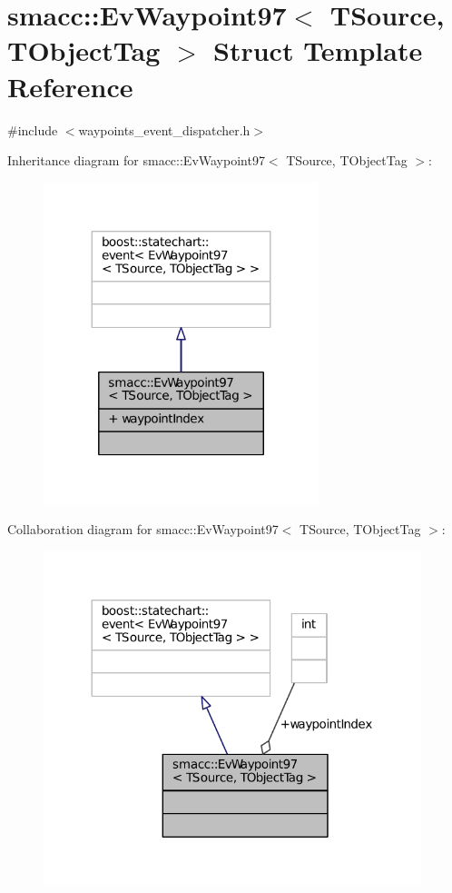 \hypertarget{structsmacc_1_1EvWaypoint97}{}\section{smacc\+:\+:Ev\+Waypoint97$<$ T\+Source, T\+Object\+Tag $>$ Struct Template Reference}
\label{structsmacc_1_1EvWaypoint97}


{\ttfamily \#include $<$waypoints\+\_\+event\+\_\+dispatcher.\+h$>$}



Inheritance diagram for smacc\+:\+:Ev\+Waypoint97$<$ T\+Source, T\+Object\+Tag $>$\+:
\nopagebreak
\begin{figure}[H]
\begin{center}
\leavevmode
\includegraphics[width=227pt]{structsmacc_1_1EvWaypoint97__inherit__graph}
\end{center}
\end{figure}


Collaboration diagram for smacc\+:\+:Ev\+Waypoint97$<$ T\+Source, T\+Object\+Tag $>$\+:
\nopagebreak
\begin{figure}[H]
\begin{center}
\leavevmode
\includegraphics[width=312pt]{structsmacc_1_1EvWaypoint97__coll__graph}
\end{center}
\end{figure}
